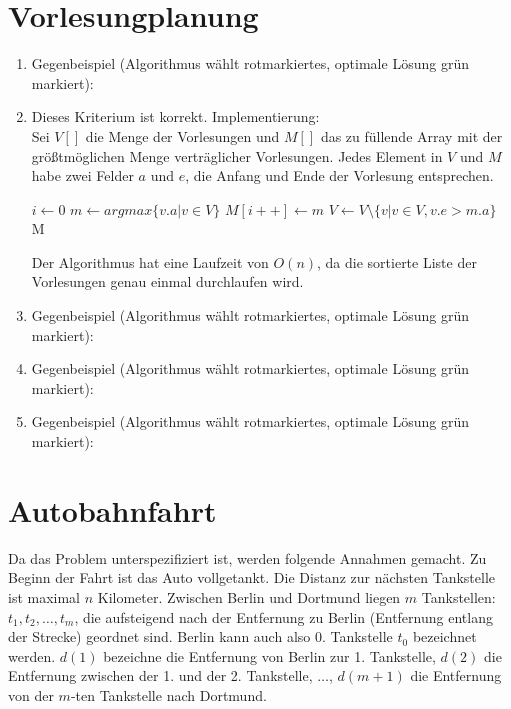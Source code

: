 \documentclass[a4paper,10pt]{scrartcl}
\begin{document}
\section{Vorlesungplanung}
\begin{enumerate}
 \item Gegenbeispiel (Algorithmus wählt rotmarkiertes, optimale Lösung grün markiert):
  \vfill

  \item Dieses Kriterium ist korrekt. Implementierung: \\
	Sei $V[]$ die Menge der Vorlesungen und $M[]$ das zu füllende
	Array mit der größtmöglichen Menge verträglicher Vorlesungen.
	Jedes Element in $V$ und $M$ habe zwei Felder $a$ und $e$, die
	Anfang und Ende der Vorlesung entsprechen.
	\begin{algorithmic}
		\STATE $i \gets 0$
			\STATE $m \gets argmax\{v.a | v \in V\}$
			\STATE $M[i++] \gets m$
			\STATE $V \gets V \setminus \{v | v \in V, v.e > m.a\}$
		\ENDWHILE
		\RETURN M
	\end{algorithmic}
	Der Algorithmus hat eine Laufzeit von $O(n)$, da die sortierte
	Liste der Vorlesungen genau einmal durchlaufen wird.
  \item Gegenbeispiel (Algorithmus wählt rotmarkiertes, optimale Lösung grün markiert):
 \vfill

\item Gegenbeispiel (Algorithmus wählt rotmarkiertes, optimale Lösung grün markiert):

 \vfill
\item Gegenbeispiel (Algorithmus wählt rotmarkiertes, optimale Lösung grün markiert):

 \vfill
\end{enumerate}
\section{Autobahnfahrt}
Da das Problem unterspezifiziert ist, werden folgende Annahmen gemacht. Zu Beginn der Fahrt ist das Auto vollgetankt. Die Distanz zur nächsten Tankstelle ist maximal $n$ Kilometer.
Zwischen Berlin und Dortmund liegen $m$ Tankstellen: $t_1, t_2, \hdots, t_m$, die aufsteigend nach der Entfernung zu Berlin (Entfernung entlang der Strecke) geordnet sind. Berlin kann auch also 0.
Tankstelle $t_0$ bezeichnet werden.
$d(1)$ bezeichne die Entfernung von Berlin zur 1. Tankstelle, $d(2)$ die Entfernung zwischen der 1. und der 2. Tankstelle, $\hdots$, $d(m + 1)$ die Entfernung von der $m$-ten Tankstelle nach Dortmund.
\end{document}
